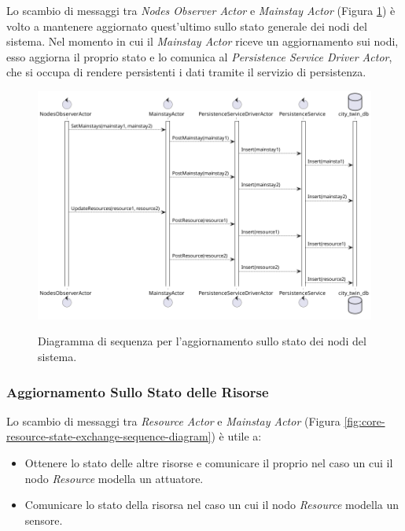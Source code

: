 \documentclass[12pt]{article}
\begin{document}
Lo scambio di messaggi tra \textit{Nodes Observer Actor} e \textit{Mainstay Actor} (Figura \ref{fig:core-nodes-state-sequence-diagram}) è volto a mantenere aggiornato quest'ultimo sullo stato generale dei nodi del sistema. Nel momento in cui il \textit{Mainstay Actor} riceve un aggiornamento sui nodi, esso aggiorna il proprio stato e lo comunica al \textit{Persistence Service Driver Actor}, che si occupa di rendere persistenti i dati tramite il servizio di persistenza.

\begin{figure}[H]
    \caption{Diagramma di sequenza per l'aggiornamento sullo stato dei nodi del sistema.}
    \includegraphics[width=\textwidth]{../assets/images/core-nodes-state-sequence-diagram.png}
    \label{fig:core-nodes-state-sequence-diagram}
\end{figure}

\subsubsection{Aggiornamento Sullo Stato delle Risorse}

Lo scambio di messaggi tra \textit{Resource Actor} e \textit{Mainstay Actor} (Figura \ref{fig:core-resource-state-exchange-sequence-diagram}) è utile a:
\begin{itemize}
    \item Ottenere lo stato delle altre risorse e comunicare il proprio nel caso un cui il nodo \textit{Resource} modella un attuatore.
    \item Comunicare lo stato della risorsa nel caso un cui il nodo \textit{Resource} modella un sensore.
\end{itemize}
\end{document}
